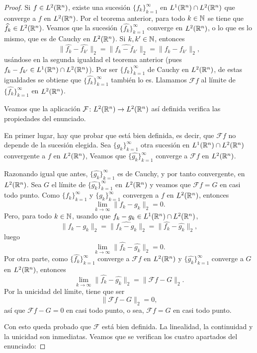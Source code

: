 \documentclass[a4paper, 11pt, oneside]{report}
\begin{document}
\begin{proof}
  Si $f \in L^2(\mathbb R^n)$, existe una sucesión $\{f_k\}_{k =1}^\infty$ en $L^1(\mathbb R^n) \cap L^2(\mathbb R^n)$ que converge a $f$ en $L^2(\mathbb R^n)$. Por el teorema anterior, para todo $k \in \mathbb N$ se tiene que $\widehat{f_k} \in L^2(\mathbb R^n)$. Veamos que la sucesión $\{\widehat{f_k}\}_{k=1}^\infty$ converge en $L^2(\mathbb R^n)$, o lo que es lo mismo, que es de Cauchy en $L^2(\mathbb R^n)$. Si $k, k' \in \mathbb N$, entonces
  \[\|\widehat{f_k} - \widehat{f_{k'}}\|_2 = \|\widehat{f_k-f_{k'}}\|_2 = \|f_k-f_{k'}\|_2,\]
  usándose en la segunda igualdad el teorema anterior (pues $f_k - f_{k'} \in L^1(\mathbb R^n) \cap L^2(\mathbb R^n)$). Por ser $\{f_k\}_{k=1}^\infty$ de Cauchy en $L^2(\mathbb R^n)$, de estas igualdades se obtiene que $\{\widehat{f_k}\}_{k=1}^\infty$ también lo es. Llamamos $\mathcal{F}f$ al límite de $\{\widehat{f_k}\}_{k=1}^\infty$ en $L^2(\mathbb R^n)$.

  Veamos que la aplicación $\mathcal{F} \colon L^2(\mathbb R^n) \to L^2(\mathbb R^n)$ así definida verifica las propiedades del enunciado. 
  
  En primer lugar, hay que probar que está bien definida, es decir, que $\mathcal{F}f$ no depende de la sucesión elegida. Sea $\{g_k\}_{k=1}^\infty$ otra sucesión en $L^1(\mathbb R^n) \cap L^2(\mathbb R^n)$ convergente a $f$ en $L^2(\mathbb R^n)$, Veamos que $\{\widehat{g_k}\}_{k=1}^\infty$ converge a $\mathcal{F}f$ en $L^2(\mathbb R^n)$. 
  
  Razonando igual que antes, $\{\widehat{g_k}\}_{k=1}^\infty$ es de Cauchy, y por tanto convergente, en $L^2(\mathbb R^n)$. Sea $G$ el límite de $\{\widehat{g_k}\}_{k=1}^\infty$ en $L^2(\mathbb R^n)$ y veamos que $\mathcal{F}f = G$ en casi todo punto. Como $\{f_k\}_{k=1}^\infty$ y $\{g_k\}_{k=1}^\infty$ convergen a $f$ en $L^2(\mathbb R^n)$, entonces
  \[\lim_{k\to \infty} \|f_k - g_k\|_2 = 0.\]
  Pero, para todo $k \in \mathbb N$, usando que $f_k-g_k \in L^1(\mathbb R^n) \cap L^2(\mathbb R^n)$,
  \[\|f_k-g_k\|_2 = \|\widehat{f_k-g_k}\|_2 = \|\widehat{f_k} - \widehat{g_k}\|_2,\]
  luego
  \[\lim_{k \to \infty} \|\widehat{f_k} - \widehat{g_k}\|_2 = 0.\]
  Por otra parte, como $\{\widehat{f_k}\}_{k=1}^\infty$ converge a $\mathcal{F}f$ en $L^2(\mathbb R^n)$ y $\{\widehat{g_k}\}_{k=1}^\infty$ converge a $G$ en $L^2(\mathbb R^n)$, entonces
  \[\lim_{k \to \infty} \|\widehat{f_k} - \widehat{g_k}\|_2 = \|\mathcal{F}f - G\|_2.\]
  Por la unicidad del límite, tiene que ser \[\|\mathcal{F}f - G\|_2 = 0,\] así que $\mathcal{F}f- G = 0$ en casi todo punto, o sea, $\mathcal{F} f = G$ en casi todo punto.

  Con esto queda probado que $\mathcal{F}$ está bien definida. La linealidad, la continuidad y la unicidad son inmediatas. Veamos que se verifican los cuatro apartados del enunciado:


\end{proof}
\end{document}
